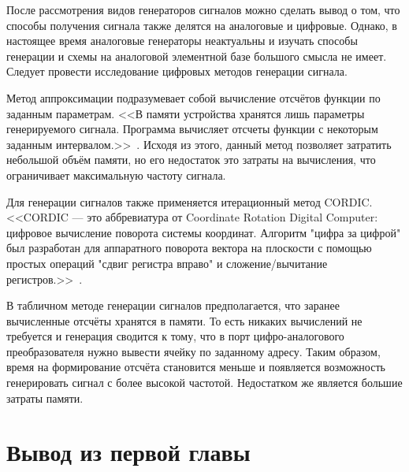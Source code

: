 	После рассмотрения видов генераторов сигналов можно сделать вывод о том, что способы получения сигнала также делятся на аналоговые и цифровые. Однако, в настоящее время аналоговые генераторы неактуальны и изучать способы генерации и схемы на аналоговой элементной базе большого смысла не имеет. Следует провести исследование цифровых методов генерации сигнала. 
	
	Метод аппроксимации подразумевает собой вычисление отсчётов функции по заданным параметрам. <<В памяти устройства хранятся лишь параметры генерируемого сигнала. Программа вычисляет отсчеты функции с некоторым заданным интервалом.>>~\cite{leso}. Исходя из этого, данный метод позволяет затратить небольшой объём памяти, но его недостаток это затраты на вычисления, что ограничивает максимальную частоту сигнала. 

	Для генерации сигналов также применяется итерационный метод CORDIC. <<CORDIC --- это аббревиатура от Coordinate Rotation Digital Computer: цифровое вычисление поворота системы координат. Алгоритм "цифра за цифрой" был разработан для аппаратного поворота вектора на плоскости с помощью простых операций "сдвиг регистра вправо" и сложение/вычитание регистров.>>~\cite{cordic}.
	
	
		
	В табличном методе генерации сигналов предполагается, что заранее вычисленные отсчёты хранятся в памяти. То есть никаких вычислений не требуется и генерация сводится к тому, что в порт цифро-аналогового преобразователя нужно вывести ячейку по заданному адресу. Таким образом, время на формирование отсчёта становится меньше и появляется возможность генерировать сигнал с более высокой частотой. Недостатком же является большие затраты памяти.
	

\section{Вывод из первой главы}
	
	
	